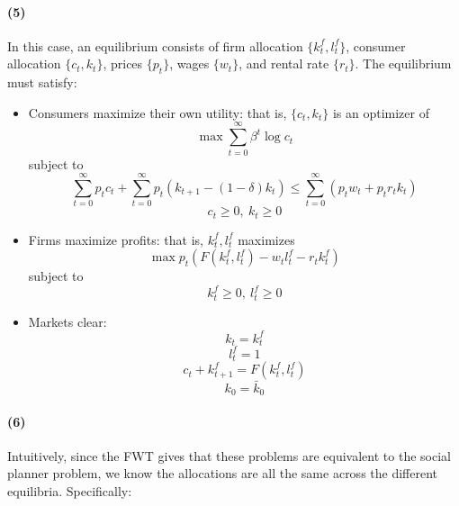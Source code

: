 \documentclass[10pt,letter]{article}
\newcommand{\problempart}[1]{\paragraph{#1}}
\begin{document}
\problempart{(5)}
In this case, an equilibrium consists of firm allocation $\{ k_t^f, l_t^f \}$, consumer allocation $\{ c_t, k_t \}$, prices $\{ p_t \}$, wages $\{ w_t \}$, and rental rate $\{ r_t \}$. The equilibrium must satisfy:
\begin{itemize}
\item Consumers maximize their own utility: that is, $\{c_t, k_t \}$ is an optimizer of
\[ \max \sum_{t=0}^\infty \beta^t \log c_t \]
subject to
\[ \sum_{t=0}^\infty p_t c_t + \sum_{t=0}^\infty p_t (k_{t+1} - (1-\delta)k_t)  \le \sum_{t=0}^\infty (p_t w_t + p_t r_t k_t) \]
\[ c_t\ge 0, \ k_t \ge 0 \]
\item Firms maximize profits: that is, $k_t^f, l_t^f$ maximizes
\[ \max p_t (F(k^f_t, l^f_t) - w_t l^f_t -r_t k^f_t) \]
subject to
\[k^f_t \ge 0, \ l^f_t \ge 0\]
\item Markets clear:
\[ k_t = k^f_t \]
\[ l_t^f = 1 \]
\[ c_t + k_{t+1}^f = F(k^f_t, l^f_t) \]
\[ k_0 = \bar{k}_0 \]
\end{itemize}
\problempart{(6)}
Intuitively, since the FWT gives that these problems are equivalent to the social planner problem, we know the allocations are all the same across the different equilibria. Specifically:
\end{document}
